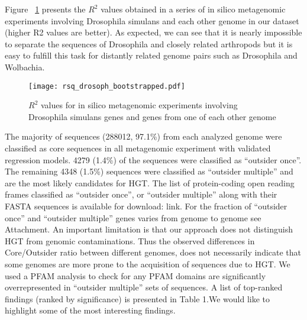 Figure ~\ref{fig:rsquared_curve} presents the $R^2$ values obtained in a series of in silico metagenomic
experiments involving Drosophila simulans and each other genome in our dataset
(higher R2 values are better). As expected, we can see that it is nearly
impossible to separate the sequences of Drosophila and closely related
arthropods but it is easy to fulfill this task for distantly related genome
pairs such as Drosophila and Wolbachia.
\begin{center}
\begin{figure}
\texttt{[image: rsq\_drosoph\_bootstrapped.pdf]}
\caption{$R^2$ values for in silico metagenomic experiments involving Drosophila simulans genes and genes from one of each other genome}
\label{fig:rsquared_curve}
\end{figure}
\end{center}
The majority of sequences
(288012, 97.1\%) from each analyzed genome were classified as core sequences in
all metagenomic experiment with validated regression models. 4279 (1.4\%) of
the sequences were classified as “outsider once”. The remaining 4348 (1.5\%)
sequences were classified as “outsider multiple” and are the most likely
candidates for HGT. The list of protein-coding open reading frames classified
as “outsider once”, or “outsider multiple” along with their FASTA sequences is
available for download: link. For the fraction of “outsider once” and “outsider
multiple” genes varies from genome to genome see Attachment.
An important limitation is that our approach does not distinguish HGT from genomic
contaminations. Thus the observed differences in Core/Outsider ratio between
different genomes, does not necessarily indicate that some genomes are more
prone to the acquisition of sequences due to HGT. We used a PFAM analysis to
check for any PFAM domains are significantly overrepresented in “outsider
multiple” sets of sequences. A list of top-ranked findings (ranked by
significance) is presented in Table 1.We would like to highlight some of the
most interesting findings.
